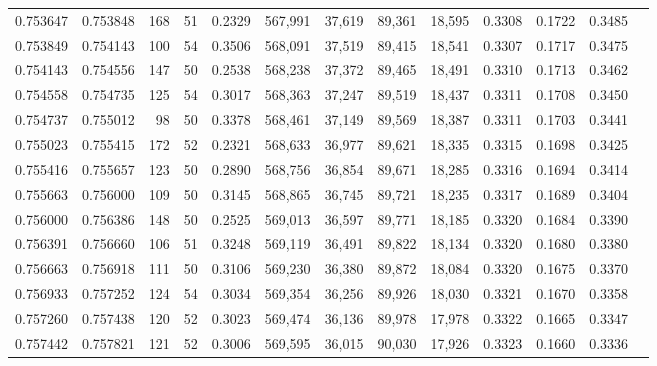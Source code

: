 \begin{tabular}{rrrrrrrrrrrrr}
0.753647 & 0.753848 &   168 &  51 &                                     0.2329 & 567,991 &  37,619 &  89,361 &  18,595 & 0.3308 & 0.1722 & 0.3485 \\
0.753849 & 0.754143 &   100 &  54 &                                     0.3506 & 568,091 &  37,519 &  89,415 &  18,541 & 0.3307 & 0.1717 & 0.3475 \\
0.754143 & 0.754556 &   147 &  50 &                                     0.2538 & 568,238 &  37,372 &  89,465 &  18,491 & 0.3310 & 0.1713 & 0.3462 \\
0.754558 & 0.754735 &   125 &  54 &                                     0.3017 & 568,363 &  37,247 &  89,519 &  18,437 & 0.3311 & 0.1708 & 0.3450 \\
0.754737 & 0.755012 &    98 &  50 &                                     0.3378 & 568,461 &  37,149 &  89,569 &  18,387 & 0.3311 & 0.1703 & 0.3441 \\
0.755023 & 0.755415 &   172 &  52 &                                     0.2321 & 568,633 &  36,977 &  89,621 &  18,335 & 0.3315 & 0.1698 & 0.3425 \\
0.755416 & 0.755657 &   123 &  50 &                                     0.2890 & 568,756 &  36,854 &  89,671 &  18,285 & 0.3316 & 0.1694 & 0.3414 \\
0.755663 & 0.756000 &   109 &  50 &                                     0.3145 & 568,865 &  36,745 &  89,721 &  18,235 & 0.3317 & 0.1689 & 0.3404 \\
0.756000 & 0.756386 &   148 &  50 &                                     0.2525 & 569,013 &  36,597 &  89,771 &  18,185 & 0.3320 & 0.1684 & 0.3390 \\
0.756391 & 0.756660 &   106 &  51 &                                     0.3248 & 569,119 &  36,491 &  89,822 &  18,134 & 0.3320 & 0.1680 & 0.3380 \\
0.756663 & 0.756918 &   111 &  50 &                                     0.3106 & 569,230 &  36,380 &  89,872 &  18,084 & 0.3320 & 0.1675 & 0.3370 \\
0.756933 & 0.757252 &   124 &  54 &                                     0.3034 & 569,354 &  36,256 &  89,926 &  18,030 & 0.3321 & 0.1670 & 0.3358 \\
0.757260 & 0.757438 &   120 &  52 &                                     0.3023 & 569,474 &  36,136 &  89,978 &  17,978 & 0.3322 & 0.1665 & 0.3347 \\
0.757442 & 0.757821 &   121 &  52 &                                     0.3006 & 569,595 &  36,015 &  90,030 &  17,926 & 0.3323 & 0.1660 & 0.3336 \\

\end{tabular}
